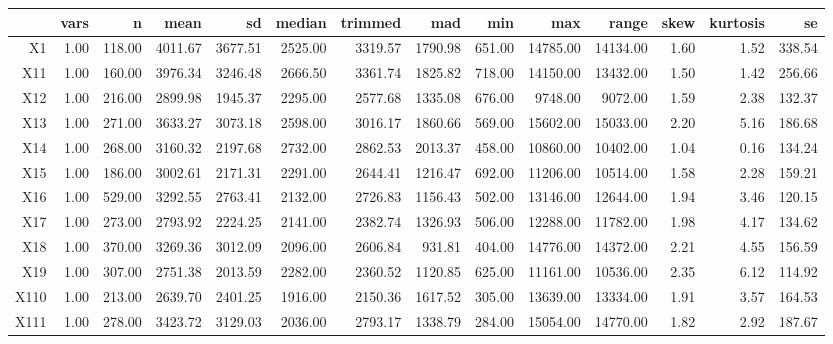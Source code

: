 \begin{tabular}{rrrrrrrrrrrrrr}
  \hline
 & vars & n & mean & sd & median & trimmed & mad & min & max & range & skew & kurtosis & se \\ 
  \hline
X1 & 1.00 & 118.00 & 4011.67 & 3677.51 & 2525.00 & 3319.57 & 1790.98 & 651.00 & 14785.00 & 14134.00 & 1.60 & 1.52 & 338.54 \\ 
  X11 & 1.00 & 160.00 & 3976.34 & 3246.48 & 2666.50 & 3361.74 & 1825.82 & 718.00 & 14150.00 & 13432.00 & 1.50 & 1.42 & 256.66 \\ 
  X12 & 1.00 & 216.00 & 2899.98 & 1945.37 & 2295.00 & 2577.68 & 1335.08 & 676.00 & 9748.00 & 9072.00 & 1.59 & 2.38 & 132.37 \\ 
  X13 & 1.00 & 271.00 & 3633.27 & 3073.18 & 2598.00 & 3016.17 & 1860.66 & 569.00 & 15602.00 & 15033.00 & 2.20 & 5.16 & 186.68 \\ 
  X14 & 1.00 & 268.00 & 3160.32 & 2197.68 & 2732.00 & 2862.53 & 2013.37 & 458.00 & 10860.00 & 10402.00 & 1.04 & 0.16 & 134.24 \\ 
  X15 & 1.00 & 186.00 & 3002.61 & 2171.31 & 2291.00 & 2644.41 & 1216.47 & 692.00 & 11206.00 & 10514.00 & 1.58 & 2.28 & 159.21 \\ 
  X16 & 1.00 & 529.00 & 3292.55 & 2763.41 & 2132.00 & 2726.83 & 1156.43 & 502.00 & 13146.00 & 12644.00 & 1.94 & 3.46 & 120.15 \\ 
  X17 & 1.00 & 273.00 & 2793.92 & 2224.25 & 2141.00 & 2382.74 & 1326.93 & 506.00 & 12288.00 & 11782.00 & 1.98 & 4.17 & 134.62 \\ 
  X18 & 1.00 & 370.00 & 3269.36 & 3012.09 & 2096.00 & 2606.84 & 931.81 & 404.00 & 14776.00 & 14372.00 & 2.21 & 4.55 & 156.59 \\ 
  X19 & 1.00 & 307.00 & 2751.38 & 2013.59 & 2282.00 & 2360.52 & 1120.85 & 625.00 & 11161.00 & 10536.00 & 2.35 & 6.12 & 114.92 \\ 
  X110 & 1.00 & 213.00 & 2639.70 & 2401.25 & 1916.00 & 2150.36 & 1617.52 & 305.00 & 13639.00 & 13334.00 & 1.91 & 3.57 & 164.53 \\ 
  X111 & 1.00 & 278.00 & 3423.72 & 3129.03 & 2036.00 & 2793.17 & 1338.79 & 284.00 & 15054.00 & 14770.00 & 1.82 & 2.92 & 187.67 \\ 
   \hline
\end{tabular}

